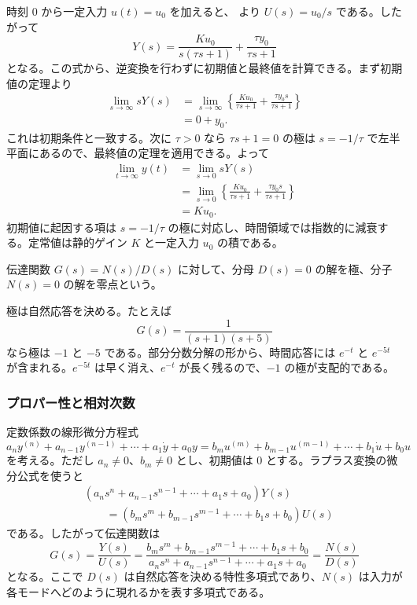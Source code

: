 時刻 $0$ から一定入力 $u(t)=u_0$ を加えると、 より $U(s)=u_0/s$ である。したがって
\begin{equation}
  Y(s)=\frac{K u_0}{s(\tau s+1)}+
  \frac{\tau y_0}{\tau s+1}
  \label{eq:first-order-laplace-step}
\end{equation}
となる。この式から、逆変換を行わずに初期値と最終値を計算できる。まず初期値の定理より
\begin{align}
  \lim_{s\to\infty}sY(s)
  &=\lim_{s\to\infty}\left\{
    \frac{K u_0}{\tau s+1}
    +\frac{\tau y_0 s}{\tau s+1}\right\}\\
  &=0+y_0.
\end{align}
これは初期条件と一致する。次に $\tau>0$ なら $\tau s+1=0$ の極は $s=-1/\tau$ で左半平面にあるので、最終値の定理を適用できる。よって
\begin{align}
  \lim_{t\to\infty}y(t)
  &=\lim_{s\to0}sY(s)\\
  &=\lim_{s\to0}\left\{
    \frac{K u_0}{\tau s+1}
    +\frac{\tau y_0 s}{\tau s+1}\right\}\\
  &=K u_0.
\end{align}
初期値に起因する項は $s=-1/\tau$ の極に対応し、時間領域では指数的に減衰する。定常値は静的ゲイン $K$ と一定入力 $u_0$ の積である。

\begin{definition}[極と零点]
伝達関数 $G(s)=N(s)/D(s)$ に対して、分母 $D(s)=0$ の解を極、分子 $N(s)=0$ の解を零点という。
\end{definition}

極は自然応答を決める。たとえば
\begin{equation}
  G(s)=\frac{1}{(s+1)(s+5)}
\end{equation}
なら極は $-1$ と $-5$ である。部分分数分解の形から、時間応答には $e^{-t}$ と $e^{-5t}$ が含まれる。$e^{-5t}$ は早く消え、$e^{-t}$ が長く残るので、$-1$ の極が支配的である。

\subsubsection{プロパー性と相対次数}

定数係数の線形微分方程式
\begin{equation}
  a_n y^{(n)}+a_{n-1}y^{(n-1)}+\cdots+a_1\dot{y}+a_0y
  =
  b_m u^{(m)}+b_{m-1}u^{(m-1)}+\cdots+b_1\dot{u}+b_0u
  \label{eq:input-output-ode}
\end{equation}
を考える。ただし $a_n\neq0$、$b_m\neq0$ とし、初期値は 0 とする。ラプラス変換の微分公式を使うと
\begin{align}
  &(a_ns^n+a_{n-1}s^{n-1}+\cdots+a_1s+a_0)Y(s)\\
  &\qquad
  =(b_ms^m+b_{m-1}s^{m-1}+\cdots+b_1s+b_0)U(s)
\end{align}
である。したがって伝達関数は
\begin{equation}
  G(s)=\frac{Y(s)}{U(s)}
  =
  \frac{b_ms^m+b_{m-1}s^{m-1}+\cdots+b_1s+b_0}
       {a_ns^n+a_{n-1}s^{n-1}+\cdots+a_1s+a_0}
  =
  \frac{N(s)}{D(s)}
  \label{eq:rational-transfer}
\end{equation}
となる。ここで $D(s)$ は自然応答を決める特性多項式であり、$N(s)$ は入力が各モードへどのように現れるかを表す多項式である。

